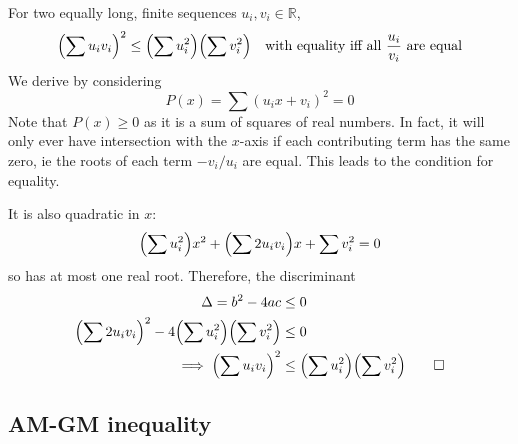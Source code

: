 \documentclass[fleqn,a4paper,11pt]{article}
\begin{document}
    For two equally long, finite sequences \(u_i, v_i \in \mathbb R\),
    \begin{equation}
    \pqty{\sum u_i v_i}^2 \le \pqty{\sum u_i^2} \pqty{\sum v_i^2}
        \quad \text{with equality iff all \(\frac{u_i}{v_i}\) are equal}
    \end{equation}
    We derive by considering
    \begin{equation*}
    P(x) = \sum (u_i x + v_i)^2 = 0
    \end{equation*}
    Note that \(P(x) \ge 0\) as it is a sum of squares of real numbers. In fact,
    it will only ever have intersection with the \(x\)-axis if each contributing
    term has the same zero, ie the roots of each term \(-v_i/u_i\) are equal.
    This leads to the condition for equality.

    It is also quadratic in \(x\):
    \begin{equation*}
    \pqty{\sum u_i^2} x^2 + \pqty{\sum 2 u_i v_i} x + \sum v_i^2 = 0
    \end{equation*}
    so has at most one real root. Therefore, the discriminant
    \begin{align*}
    \Delta = b^2 - 4ac &\le 0 \\
    \pqty{\sum 2 u_i v_i}^2 - 4\pqty{\sum u_i^2}\pqty{\sum v_i^2} &\le 0
    \\\implies
    \pqty{\sum u_i v_i}^2 &\le \pqty{\sum u_i^2} \pqty{\sum v_i^2} \qed
    \end{align*}

    \subsection{AM-GM inequality}
\end{document}
